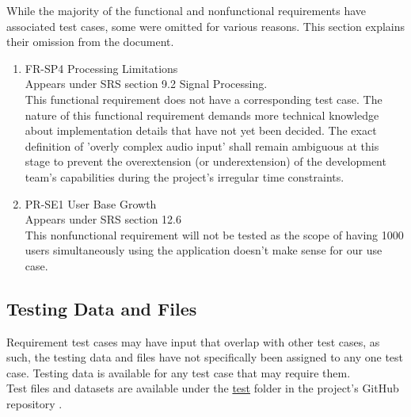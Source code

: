 \documentclass[12pt, titlepage]{article}
\begin{document}
While the majority of the functional and nonfunctional requirements have associated test cases, 
some were omitted for various reasons. This section explains their omission from the document. 
\begin{enumerate}
  \item FR-SP4 Processing Limitations \\
  Appears under SRS section 9.2 Signal Processing. \\
  This functional requirement does not
  have a corresponding test case. The nature of this functional requirement demands more technical knowledge
  about implementation details that have not yet been decided. The exact definition of 'overly complex audio input' shall
  remain ambiguous at this stage to prevent the overextension (or underextension) of the development team's
  capabilities during the project's irregular time constraints.\\
  \item PR-SE1 User Base Growth\\
  Appears under SRS section 12.6\\
  This nonfunctional requirement will not be tested as the scope of having 1000 users simultaneously using the application doesn't make sense
  for our use case.\\
\end{enumerate}

\subsection{Testing Data and Files}
Requirement test cases may have input that overlap with other test cases, as such, the testing data and files have not specifically been
assigned to any one test case. Testing data is available for any test case that may require them. \\
Test files and datasets are available under the \href{https://github.com/emilyperica/ScoreGen/tree/9203b49bd6b54247517192c6b1992f5fa952478f/test}{test} folder
in the project's GitHub repository \citep{sample-formats, piano-refscales-on-C, piano-wholetone-scale-on-C, piano-c-major-scales, piano-chord-progression1, piano-c-major-asc-desc, 
piano-hot-cross-buns-solo}. \\
\newpage




\newpage

\end{document}

